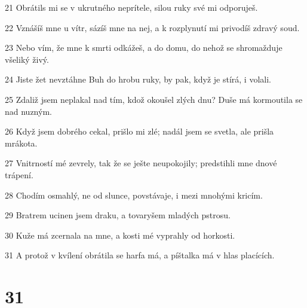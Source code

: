 \par 21 Obrátils mi se v ukrutného neprítele, silou ruky své mi odporuješ.
\par 22 Vznášíš mne u vítr, sázíš mne na nej, a k rozplynutí mi privodíš zdravý soud.
\par 23 Nebo vím, že mne k smrti odkážeš, a do domu, do nehož se shromažduje všeliký živý.
\par 24 Jiste žet nevztáhne Buh do hrobu ruky, by pak, když je stírá, i volali.
\par 25 Zdaliž jsem neplakal nad tím, kdož okoušel zlých dnu? Duše má kormoutila se nad nuzným.
\par 26 Když jsem dobrého cekal, prišlo mi zlé; nadál jsem se svetla, ale prišla mrákota.
\par 27 Vnitrností mé zevrely, tak že se ješte neupokojily; predstihli mne dnové trápení.
\par 28 Chodím osmahlý, ne od slunce, povstávaje, i mezi mnohými kricím.
\par 29 Bratrem ucinen jsem draku, a tovaryšem mladých pstrosu.
\par 30 Kuže má zcernala na mne, a kosti mé vyprahly od horkosti.
\par 31 A protož v kvílení obrátila se harfa má, a píštalka má v hlas placících.

\chapter{31}

